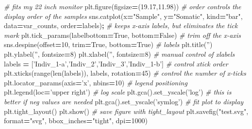\documentclass[]{book}
\newenvironment{Shaded}{\begin{snugshade}}{\end{snugshade}}
\newcommand{\DecValTok}[1]{\textcolor[rgb]{0.00,0.00,0.81}{#1}}
\newcommand{\FloatTok}[1]{\textcolor[rgb]{0.00,0.00,0.81}{#1}}
\newcommand{\StringTok}[1]{\textcolor[rgb]{0.31,0.60,0.02}{#1}}
\newcommand{\CommentTok}[1]{\textcolor[rgb]{0.56,0.35,0.01}{\textit{#1}}}
\newcommand{\VariableTok}[1]{\textcolor[rgb]{0.00,0.00,0.00}{#1}}
\newcommand{\OperatorTok}[1]{\textcolor[rgb]{0.81,0.36,0.00}{\textbf{#1}}}
\newcommand{\BuiltInTok}[1]{#1}
\newcommand{\NormalTok}[1]{#1}
\begin{document}
\begin{Shaded}
\begin{Highlighting}[]
\CommentTok{# fits my 22 inch monitor}
\NormalTok{plt.figure(figsize}\OperatorTok{=}\NormalTok{(}\FloatTok{19.17}\NormalTok{,}\FloatTok{11.98}\NormalTok{))}
\CommentTok{# order controls the display order of the samples}
\NormalTok{sns.catplot(x}\OperatorTok{=}\StringTok{"Sample"}\NormalTok{, y}\OperatorTok{=}\StringTok{"Somatic"}\NormalTok{, kind}\OperatorTok{=}\StringTok{"bar"}\NormalTok{, data}\OperatorTok{=}\NormalTok{var_counts, order}\OperatorTok{=}\NormalTok{labels)}\OperatorTok{;}
\CommentTok{# keeps x-axis labels, but eliminates the tick mark}
\NormalTok{plt.tick_params(labelbottom}\OperatorTok{=}\VariableTok{True}\NormalTok{, bottom}\OperatorTok{=}\VariableTok{False}\NormalTok{)}
\CommentTok{# trim off the x-axis}
\NormalTok{sns.despine(offset}\OperatorTok{=}\DecValTok{10}\NormalTok{, trim}\OperatorTok{=}\VariableTok{True}\NormalTok{, bottom}\OperatorTok{=}\VariableTok{True}\NormalTok{)}
\CommentTok{# labels}
\NormalTok{plt.title(}\StringTok{''}\NormalTok{)}
\NormalTok{plt.ylabel(}\StringTok{''}\NormalTok{, fontsize}\OperatorTok{=}\DecValTok{8}\NormalTok{)}
\NormalTok{plt.xlabel(}\StringTok{''}\NormalTok{, fontsize}\OperatorTok{=}\DecValTok{8}\NormalTok{)}
\CommentTok{# manual control of xlabels}
\NormalTok{labels }\OperatorTok{=}\NormalTok{ [}\StringTok{'Indiv_1-a'}\NormalTok{,}\StringTok{'Indiv_2'}\NormalTok{,}\StringTok{'Indiv_3'}\NormalTok{,}\StringTok{'Indiv_1-b'}\NormalTok{]}
\CommentTok{# control xtick order}
\NormalTok{plt.xticks(}\BuiltInTok{range}\NormalTok{(}\BuiltInTok{len}\NormalTok{(labels)), labels, rotation}\OperatorTok{=}\DecValTok{45}\NormalTok{)}
\CommentTok{# control the number of x-ticks}
\NormalTok{plt.locator_params(axis}\OperatorTok{=}\StringTok{'x'}\NormalTok{, nbins}\OperatorTok{=}\DecValTok{10}\NormalTok{)}
\CommentTok{# legend positioning}
\NormalTok{plt.legend(loc}\OperatorTok{=}\StringTok{'upper right'}\NormalTok{)}
\CommentTok{# log scale}
\NormalTok{plt.gca().set_yscale(}\StringTok{'log'}\NormalTok{)}
\CommentTok{# this is better if neg values are needed}
\NormalTok{plt.gca().set_yscale(}\StringTok{'symlog'}\NormalTok{)}
\CommentTok{# fit plot to display}
\NormalTok{plt.tight_layout()}
\NormalTok{plt.show()}
\CommentTok{# save figure with tight_layout}
\NormalTok{plt.savefig(}\StringTok{"test.svg"}\NormalTok{, }\BuiltInTok{format}\OperatorTok{=}\StringTok{"svg"}\NormalTok{, bbox_inches}\OperatorTok{=}\StringTok{"tight"}\NormalTok{, dpi}\OperatorTok{=}\DecValTok{1000}\NormalTok{)}
\end{Highlighting}
\end{Shaded}
\end{document}
